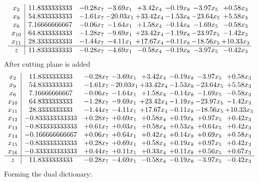 \documentclass[8pt]{article}
\begin{document}
\[\begin{array}{c| c c@{\hskip 2pt} c@{\hskip 2pt} c@{\hskip 2pt} c@{\hskip 2pt} c@{\hskip 2pt} c@{\hskip 2pt} }
 x_{2}   &  11.8333333333 & -0.28 x_{7} & -3.69 x_{1} & +  3.42 x_{4} & -0.19 x_{8} & -3.97 x_{5} & +  0.58 x_{3}\\
 x_{9}   &  54.8333333333 & -1.61 x_{7} & -20.03 x_{1} & + 33.42 x_{4} & -1.53 x_{8} & -23.64 x_{5} & +  5.58 x_{3}\\
 x_{6}   &  7.16666666667 & -0.06 x_{7} & -1.64 x_{1} & +  1.58 x_{4} & -0.14 x_{8} & -1.69 x_{5} & -0.58 x_{3}\\
 x_{10}   &  64.8333333333 & -1.28 x_{7} & -9.69 x_{1} & + 23.42 x_{4} & -1.19 x_{8} & -23.97 x_{5} & -1.42 x_{3}\\
 x_{11}   &  28.3333333333 & -1.44 x_{7} & -4.11 x_{1} & + 17.67 x_{4} & -0.11 x_{8} & -18.56 x_{5} & + 10.33 x_{3}\\
\hline
z    &  11.8333333333 & -0.28 x_{7} & -4.69 x_{1} & -0.58 x_{4} & -0.19 x_{8} & -3.97 x_{5} & -0.42 x_{3}\\
\end{array}\]
 After cutting plane is added 
\[\begin{array}{c| c c@{\hskip 2pt} c@{\hskip 2pt} c@{\hskip 2pt} c@{\hskip 2pt} c@{\hskip 2pt} c@{\hskip 2pt} }
 x_{2}   &  11.8333333333 & -0.28 x_{7} & -3.69 x_{1} & +  3.42 x_{4} & -0.19 x_{8} & -3.97 x_{5} & +  0.58 x_{3}\\
 x_{9}   &  54.8333333333 & -1.61 x_{7} & -20.03 x_{1} & + 33.42 x_{4} & -1.53 x_{8} & -23.64 x_{5} & +  5.58 x_{3}\\
 x_{6}   &  7.16666666667 & -0.06 x_{7} & -1.64 x_{1} & +  1.58 x_{4} & -0.14 x_{8} & -1.69 x_{5} & -0.58 x_{3}\\
 x_{10}   &  64.8333333333 & -1.28 x_{7} & -9.69 x_{1} & + 23.42 x_{4} & -1.19 x_{8} & -23.97 x_{5} & -1.42 x_{3}\\
 x_{11}   &  28.3333333333 & -1.44 x_{7} & -4.11 x_{1} & + 17.67 x_{4} & -0.11 x_{8} & -18.56 x_{5} & + 10.33 x_{3}\\
 x_{12}   &  -0.833333333333 & +  0.28 x_{7} & +  0.69 x_{1} & +  0.58 x_{4} & +  0.19 x_{8} & +  0.97 x_{5} & +  0.42 x_{3}\\
 x_{13}   &  -0.833333333333 & +  0.61 x_{7} & +  0.03 x_{1} & +  0.58 x_{4} & +  0.53 x_{8} & +  0.64 x_{5} & +  0.42 x_{3}\\
 x_{14}   &  -0.166666666667 & +  0.06 x_{7} & +  0.64 x_{1} & +  0.42 x_{4} & +  0.14 x_{8} & +  0.69 x_{5} & +  0.58 x_{3}\\
 x_{15}   &  -0.833333333333 & +  0.28 x_{7} & +  0.69 x_{1} & +  0.58 x_{4} & +  0.19 x_{8} & +  0.97 x_{5} & +  0.42 x_{3}\\
 x_{16}   &  -0.333333333333 & +  0.44 x_{7} & +  0.11 x_{1} & +  0.33 x_{4} & +  0.11 x_{8} & +  0.56 x_{5} & +  0.67 x_{3}\\
\hline
z    &  11.8333333333 & -0.28 x_{7} & -4.69 x_{1} & -0.58 x_{4} & -0.19 x_{8} & -3.97 x_{5} & -0.42 x_{3}\\
\end{array}\]
Forming the dual dictionary:
\end{document}

